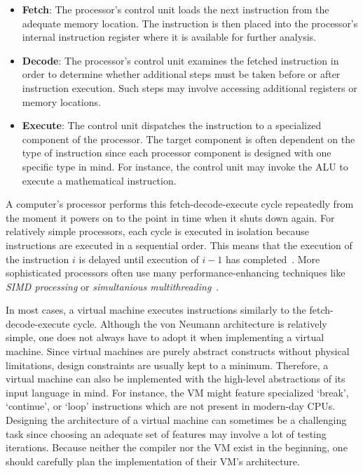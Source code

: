 \begin{itemize}
	\item \textbf{Fetch}: The processor's control unit loads the next instruction from the adequate memory location.
	      The instruction is then placed into the processor's internal instruction register where it is available for further analysis.
	\item \textbf{Decode}:
	      The processor's control unit examines the fetched instruction in order to determine whether additional steps must be taken before or after instruction execution.
	      Such steps may involve accessing additional registers or memory locations.
	\item \textbf{Execute}:
	      The control unit dispatches the instruction to a specialized component of the processor.
	      The target component is often dependent on the type of instruction since each processor component is designed with one specific type in mind.
	      For instance, the control unit may invoke the ALU to execute a mathematical instruction.
\end{itemize}

A computer's processor performs this fetch-decode-execute cycle repeatedly from the moment it powers on to the point in time when it shuts down again.
For relatively simple processors, each cycle is executed in isolation because instructions are executed in a sequential order.
This means that the execution of the instruction $i$ is delayed until execution of $i - 1$ has completed~\cite[pp.~208--209]{Ledin2020-yp}.
More sophisticated processors often use many performance-enhancing techniques like \emph{SIMD processing} or \emph{simultanious multithreading}~\cite[pp.~217f]{Ledin2020-yp}.

In most cases, a virtual machine executes instructions similarly to the fetch-decode-execute cycle.
Although the von Neumann architecture is relatively simple, one does not always have to adopt it when implementing a virtual machine.
Since virtual machines are purely abstract constructs without physical limitations, design constraints are usually kept to a minimum.
Therefore, a virtual machine can also be implemented with the high-level abstractions of its input language in mind.
For instance, the VM might feature specialized `break', `continue', or `loop' instructions which are not present in modern-day CPUs.
Designing the architecture of a virtual machine can sometimes be a challenging task since choosing an adequate set of features may involve a lot of testing iterations.
Because neither the compiler nor the VM exist in the beginning, one should carefully plan the implementation of their VM's architecture.


